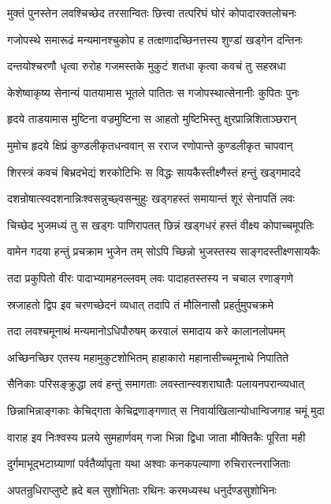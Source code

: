 \twolineshloka
{मुक्तं पुनस्तेन लवश्चिच्छेद तरसान्वितः}
{छित्त्वा तत्परिघं घोरं कोपादारक्तलोचनः}%

\twolineshloka
{गजोपस्थे समारूढं मन्यमानश्चुकोप ह}
{तत्क्षणादच्छिनत्तस्य शुण्डां खड्गेन दन्तिनः}%

\twolineshloka
{दन्तयोश्चरणौ धृत्वा रुरोह गजमस्तके}
{मुकुटं शतधा कृत्वा कवचं तु सहस्रधा}%

\twolineshloka
{केशेष्वाकृष्य सेनान्यं पातयामास भूतले}
{पातितः स गजोपस्थात्सेनानीः कुपितः पुनः}%

\twolineshloka
{हृदये ताडयामास मुष्टिना वज्रमुष्टिना}
{स आहतो मुष्टिभिस्तु क्षुरप्रान्निशिताञ्छरान्}%

\twolineshloka
{मुमोच हृदये क्षिप्रं कुण्डलीकृतधन्ववान्}
{स रराज रणोपान्ते कुण्डलीकृत चापवान्}%

\twolineshloka
{शिरस्त्रं कवचं बिभ्रदभेद्यं शरकोटिभिः}
{स विद्धः सायकैस्तीक्ष्णैस्तं हन्तुं खड्गमाददे}%

\twolineshloka
{दशन्रोषात्स्वदशनान्निःश्वसन्नुच्छ्वसन्मुहुः}
{खड्गहस्तं समायान्तं शूरं सेनापतिं लवः}%

\twolineshloka
{चिच्छेद भुजमध्यं तु स खड्गः पाणिरापतत्}
{छिन्नं खड्गधरं हस्तं वीक्ष्य कोपाच्चमूपतिः}%

\twolineshloka
{वामेन गदया हन्तुं प्रचक्राम भुजेन तम्}
{सोऽपि च्छिन्नो भुजस्तस्य साङ्गदस्तीक्ष्णसायकैः}%

\twolineshloka
{तदा प्रकुपितो वीरः पादाभ्यामहनल्लवम्}
{लवः पादाहतस्तस्य न चचाल रणाङ्गणे}%

\twolineshloka
{स्रजाहतो द्विप इव चरणच्छेदनं व्यधात्}
{तदापि तं मौलिनासौ प्रहर्तुमुपचक्रमे}%

\twolineshloka
{तदा लवश्चमूनाथं मन्यमानोऽधिपौरुषम्}
{करवालं समादाय करे कालानलोपमम्}%

\twolineshloka
{अच्छिनच्छिर एतस्य महामुकुटशोभितम्}
{हाहाकारो महानासीच्चमूनाथे निपातिते}%

\twolineshloka
{सैनिकाः परिसङ्क्रुद्धा लवं हन्तुं समागताः}
{लवस्तान्स्वशराघातैः पलायनपरान्व्यधात्}%

\twolineshloka
{छिन्नाभिन्नाङ्गकाः केचिद्गता केचिद्रणाङ्गणात्}
{स निवार्याखिलान्योधान्विजगाह चमूं मुदा}%

\twolineshloka
{वाराह इव निःश्वस्य प्रलये सुमहार्णवम्}
{गजा भिन्ना द्विधा जाता मौक्तिकैः पूरिता मही}%

\twolineshloka
{दुर्गमाभूद्भटाग्र्याणां पर्वतैर्व्यापृता यथा}
{अश्वाः कनकपल्याणा रुचिरारत्नराजिताः}%

\twolineshloka
{अपतन्रुधिराप्लुष्टे ह्रदे बल सुशोभिताः}
{रथिनः करमध्यस्थ धनुर्दण्डसुशोभिनः}%

